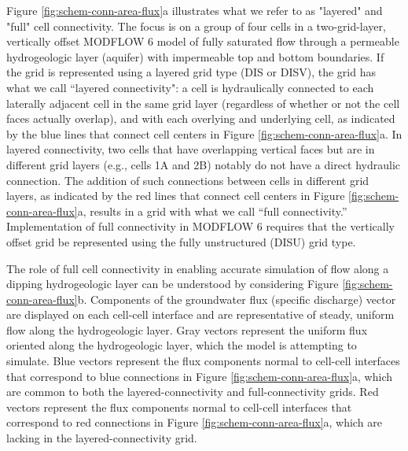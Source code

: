 \documentclass{article}
\begin{document}
Figure \ref{fig:schem-conn-area-flux}a illustrates what we refer to as "layered" and "full" cell connectivity. The focus is on a group of four cells in a two-grid-layer, vertically offset MODFLOW 6 model of fully saturated flow through a permeable hydrogeologic layer (aquifer) with impermeable top and bottom boundaries. If the grid is represented using a layered grid type (DIS or DISV), the grid has what we call ``layered connectivity": a cell is hydraulically connected to each laterally adjacent cell in the same grid layer (regardless of whether or not the cell faces actually overlap), and with each overlying and underlying cell, as indicated by the blue lines that connect cell centers in Figure \ref{fig:schem-conn-area-flux}a. In layered connectivity, two cells that have overlapping vertical faces but are in different grid layers (e.g., cells 1A and 2B) notably do not have a direct hydraulic connection. The addition of such connections between cells in different grid layers, as indicated by the red lines that connect cell centers in Figure \ref{fig:schem-conn-area-flux}a, results in a grid with what we call ``full connectivity.''  Implementation of full connectivity in MODFLOW 6 requires that the vertically offset grid be represented using the fully unstructured (DISU) grid type.

The role of full cell connectivity in enabling accurate simulation of flow along a dipping hydrogeologic layer can be understood by considering Figure \ref{fig:schem-conn-area-flux}b. Components of the groundwater flux (specific discharge) vector are displayed on each cell-cell interface and are representative of steady, uniform flow along the hydrogeologic layer. Gray vectors represent the uniform flux oriented along the hydrogeologic layer, which the model is attempting to simulate. Blue vectors represent the flux components normal to cell-cell interfaces that correspond to blue connections in Figure \ref{fig:schem-conn-area-flux}a, which are common to both the layered-connectivity and full-connectivity grids. Red vectors represent the flux components normal to cell-cell interfaces that correspond to red connections in Figure \ref{fig:schem-conn-area-flux}a, which are lacking in the layered-connectivity grid.
\end{document}
